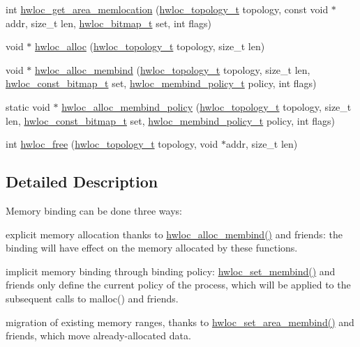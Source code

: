 \begin{DoxyCompactItemize}
\item 
int \hyperlink{a00191_ga537c7508a4e2d1db05673ec5be6e805c}{hwloc\+\_\+get\+\_\+area\+\_\+memlocation} (\hyperlink{a00186_ga9d1e76ee15a7dee158b786c30b6a6e38}{hwloc\+\_\+topology\+\_\+t} topology, const void $\ast$addr, size\+\_\+t len, \hyperlink{a00205_gaa3c2bf4c776d603dcebbb61b0c923d84}{hwloc\+\_\+bitmap\+\_\+t} set, int flags)
\item 
void $\ast$ \hyperlink{a00191_ga972b335a86a7d5e7b34bce2b243c41bc}{hwloc\+\_\+alloc} (\hyperlink{a00186_ga9d1e76ee15a7dee158b786c30b6a6e38}{hwloc\+\_\+topology\+\_\+t} topology, size\+\_\+t len)
\item 
void $\ast$ \hyperlink{a00191_ga04736461780fadcf193af218c0122273}{hwloc\+\_\+alloc\+\_\+membind} (\hyperlink{a00186_ga9d1e76ee15a7dee158b786c30b6a6e38}{hwloc\+\_\+topology\+\_\+t} topology, size\+\_\+t len, \hyperlink{a00205_gae991a108af01d408be2776c5b2c467b2}{hwloc\+\_\+const\+\_\+bitmap\+\_\+t} set, \hyperlink{a00191_gac9764f79505775d06407b40f5e4661e8}{hwloc\+\_\+membind\+\_\+policy\+\_\+t} policy, int flags)
\item 
static void $\ast$ \hyperlink{a00191_gab1b77b8408bacaf03c7e8878f7577922}{hwloc\+\_\+alloc\+\_\+membind\+\_\+policy} (\hyperlink{a00186_ga9d1e76ee15a7dee158b786c30b6a6e38}{hwloc\+\_\+topology\+\_\+t} topology, size\+\_\+t len, \hyperlink{a00205_gae991a108af01d408be2776c5b2c467b2}{hwloc\+\_\+const\+\_\+bitmap\+\_\+t} set, \hyperlink{a00191_gac9764f79505775d06407b40f5e4661e8}{hwloc\+\_\+membind\+\_\+policy\+\_\+t} policy, int flags)
\item 
int \hyperlink{a00191_ga32dbd4f54e9e4a7179f2dde37ffe6ad7}{hwloc\+\_\+free} (\hyperlink{a00186_ga9d1e76ee15a7dee158b786c30b6a6e38}{hwloc\+\_\+topology\+\_\+t} topology, void $\ast$addr, size\+\_\+t len)
\end{DoxyCompactItemize}


\subsection{Detailed Description}
Memory binding can be done three ways\+:


\begin{DoxyItemize}
\item explicit memory allocation thanks to \hyperlink{a00191_ga04736461780fadcf193af218c0122273}{hwloc\+\_\+alloc\+\_\+membind()} and friends\+: the binding will have effect on the memory allocated by these functions.
\item implicit memory binding through binding policy\+: \hyperlink{a00191_ga020951efa0ce3862bd4faec295501a7f}{hwloc\+\_\+set\+\_\+membind()} and friends only define the current policy of the process, which will be applied to the subsequent calls to malloc() and friends.
\item migration of existing memory ranges, thanks to \hyperlink{a00191_gaf881faefe20701229f07dd7dbd0125ed}{hwloc\+\_\+set\+\_\+area\+\_\+membind()} and friends, which move already-\/allocated data.
\end{DoxyItemize}

